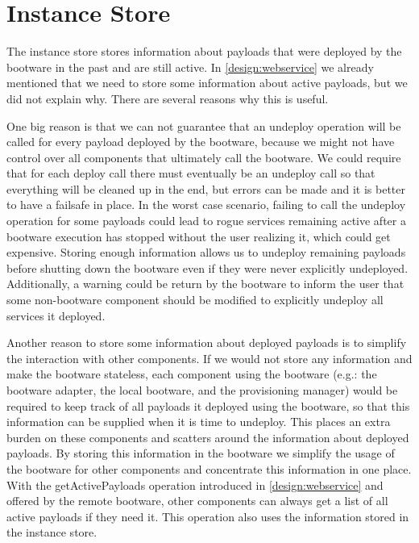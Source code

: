 \section{Instance Store}
\label{design:instancestore}

The instance store stores information about payloads that were deployed by the bootware in the past and are still active.
In \autoref{design:webservice} we already mentioned that we need to store some information about active payloads, but we did not explain why.
There are several reasons why this is useful.

One big reason is that we can not guarantee that an undeploy operation will be called for every payload deployed by the bootware, because we might not have control over all components that ultimately call the bootware.
We could require that for each deploy call there must eventually be an undeploy call so that everything will be cleaned up in the end, but errors can be made and it is better to have a failsafe in place.
In the worst case scenario, failing to call the undeploy operation for some payloads could lead to rogue services remaining active after a bootware execution has stopped without the user realizing it, which could get expensive.
Storing enough information allows us to undeploy remaining payloads before shutting down the bootware even if they were never explicitly undeployed.
Additionally, a warning could be return by the bootware to inform the user that some non-bootware component should be modified to explicitly undeploy all services it deployed.

Another reason to store some information about deployed payloads is to simplify the interaction with other components.
If we would not store any information and make the bootware stateless, each component using the bootware (e.g.: the bootware adapter, the local bootware, and the provisioning manager) would be required to keep track of all payloads it deployed using the bootware, so that this information can be supplied when it is time to undeploy.
This places an extra burden on these components and scatters around the information about deployed payloads.
By storing this information in the bootware we simplify the usage of the bootware for other components and concentrate this information in one place.
With the getActivePayloads operation introduced in \autoref{design:webservice} and offered by the remote bootware, other components can always get a list of all active payloads if they need it.
This operation also uses the information stored in the instance store.

